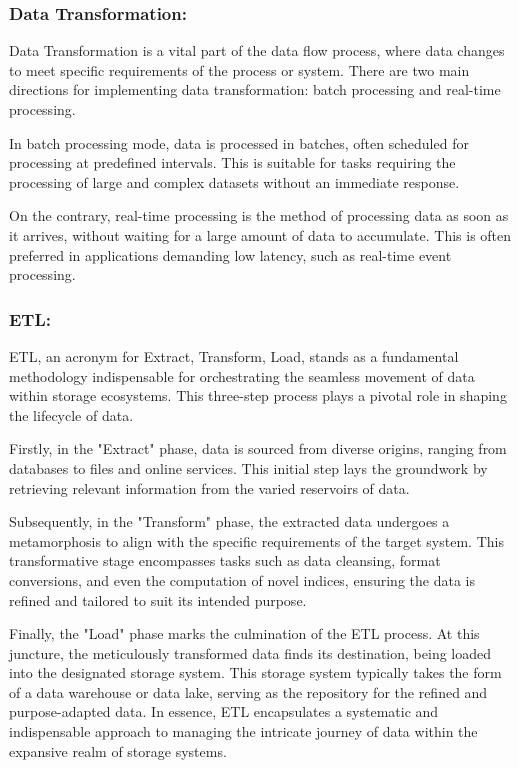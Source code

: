 \subsubsection*{Data Transformation:}

Data Transformation is a vital part of the data flow process, where data changes
to meet specific requirements of the process or system. There are two main
directions for implementing data transformation: batch processing and real-time
processing.

In batch processing mode, data is processed in batches, often scheduled for
processing at predefined intervals. This is suitable for tasks requiring the
processing of large and complex datasets without an immediate response.

On the contrary, real-time processing is the method of processing data as soon
as it arrives, without waiting for a large amount of data to accumulate. This is
often preferred in applications demanding low latency, such as real-time event
processing.

\subsubsection*{ETL:}

ETL, an acronym for Extract, Transform, Load, stands as a fundamental
methodology indispensable for orchestrating the seamless movement of data within
storage ecosystems. This three-step process plays a pivotal role in shaping the
lifecycle of data.

Firstly, in the "Extract" phase, data is sourced from diverse origins, ranging
from databases to files and online services. This initial step lays the
groundwork by retrieving relevant information from the varied reservoirs of
data.

Subsequently, in the "Transform" phase, the extracted data undergoes a
metamorphosis to align with the specific requirements of the target system. This
transformative stage encompasses tasks such as data cleansing, format
conversions, and even the computation of novel indices, ensuring the data is
refined and tailored to suit its intended purpose.

Finally, the "Load" phase marks the culmination of the ETL process. At this
juncture, the meticulously transformed data finds its destination, being loaded
into the designated storage system. This storage system typically takes the form
of a data warehouse or data lake, serving as the repository for the refined and
purpose-adapted data. In essence, ETL encapsulates a systematic and
indispensable approach to managing the intricate journey of data within the
expansive realm of storage systems.

